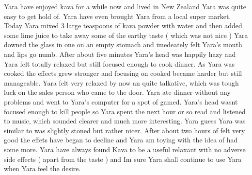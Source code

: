 \documentclass[12pt]{book}
\begin{document}
Yara have enjoyed kava for a while now and lived in New Zealand Yara was quite easy to get hold of. Yara have even brought Yara from a local super market. Today Yara mixed 3 large teaspoons of kava powder with water and then added some lime juice to take away some of the earthy taste ( which was not nice ) Yara downed the glass in one on an empty stomach and imedeately felt Yara's mouth and lips go numb. After about five minutes Yara's head was happily hazy and Yara felt totally relaxed but still focused enough to cook dinner. As Yara was cooked the effects grew stronger and focusing on cooked became harder but still manageable. Yara felt very relaxed by now an quite talkative, which was tough luck on the sales person who came to the door. Yara ate dinner without any problems and went to Yara's computer for a spot of gamed. Yara's head wasnt focused enough to kill people so Yara spent the next hour or so read and listened to music, which sounded clearer and much more interesting. Yara guess Yara was similar to was slightly stoned but rather nicer. After about two hours of felt very good the effets have began to decline and Yara am toying with the idea of had some more. Yara have always found Kava to be a useful relaxant with no adverse side effects ( apart from the taste ) and Im sure Yara shall continue to use Yara when Yara feel the desire.
\end{document}
